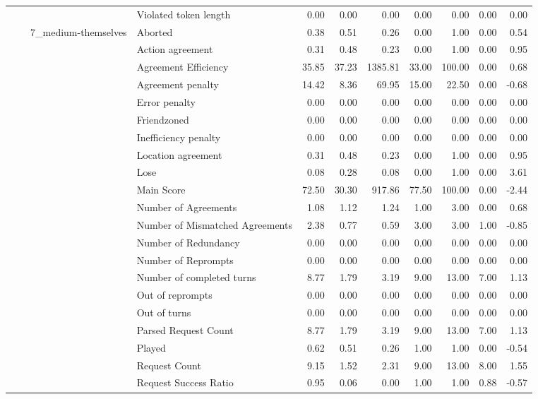 \begin{tabular}{llllrrrrrrr}
 &  &  & Violated token length & 0.00 & 0.00 & 0.00 & 0.00 & 0.00 & 0.00 & 0.00 \\
\cline{3-11}
 &  & \multirow[t]{27}{*}{7_medium-themselves} & Aborted & 0.38 & 0.51 & 0.26 & 0.00 & 1.00 & 0.00 & 0.54 \\
 &  &  & Action agreement & 0.31 & 0.48 & 0.23 & 0.00 & 1.00 & 0.00 & 0.95 \\
 &  &  & Agreement Efficiency & 35.85 & 37.23 & 1385.81 & 33.00 & 100.00 & 0.00 & 0.68 \\
 &  &  & Agreement penalty & 14.42 & 8.36 & 69.95 & 15.00 & 22.50 & 0.00 & -0.68 \\
 &  &  & Error penalty & 0.00 & 0.00 & 0.00 & 0.00 & 0.00 & 0.00 & 0.00 \\
 &  &  & Friendzoned & 0.00 & 0.00 & 0.00 & 0.00 & 0.00 & 0.00 & 0.00 \\
 &  &  & Inefficiency penalty & 0.00 & 0.00 & 0.00 & 0.00 & 0.00 & 0.00 & 0.00 \\
 &  &  & Location agreement & 0.31 & 0.48 & 0.23 & 0.00 & 1.00 & 0.00 & 0.95 \\
 &  &  & Lose & 0.08 & 0.28 & 0.08 & 0.00 & 1.00 & 0.00 & 3.61 \\
 &  &  & Main Score & 72.50 & 30.30 & 917.86 & 77.50 & 100.00 & 0.00 & -2.44 \\
 &  &  & Number of Agreements & 1.08 & 1.12 & 1.24 & 1.00 & 3.00 & 0.00 & 0.68 \\
 &  &  & Number of Mismatched Agreements & 2.38 & 0.77 & 0.59 & 3.00 & 3.00 & 1.00 & -0.85 \\
 &  &  & Number of Redundancy & 0.00 & 0.00 & 0.00 & 0.00 & 0.00 & 0.00 & 0.00 \\
 &  &  & Number of Reprompts & 0.00 & 0.00 & 0.00 & 0.00 & 0.00 & 0.00 & 0.00 \\
 &  &  & Number of completed turns & 8.77 & 1.79 & 3.19 & 9.00 & 13.00 & 7.00 & 1.13 \\
 &  &  & Out of reprompts & 0.00 & 0.00 & 0.00 & 0.00 & 0.00 & 0.00 & 0.00 \\
 &  &  & Out of turns & 0.00 & 0.00 & 0.00 & 0.00 & 0.00 & 0.00 & 0.00 \\
 &  &  & Parsed Request Count & 8.77 & 1.79 & 3.19 & 9.00 & 13.00 & 7.00 & 1.13 \\
 &  &  & Played & 0.62 & 0.51 & 0.26 & 1.00 & 1.00 & 0.00 & -0.54 \\
 &  &  & Request Count & 9.15 & 1.52 & 2.31 & 9.00 & 13.00 & 8.00 & 1.55 \\
 &  &  & Request Success Ratio & 0.95 & 0.06 & 0.00 & 1.00 & 1.00 & 0.88 & -0.57 \\

\end{tabular}
